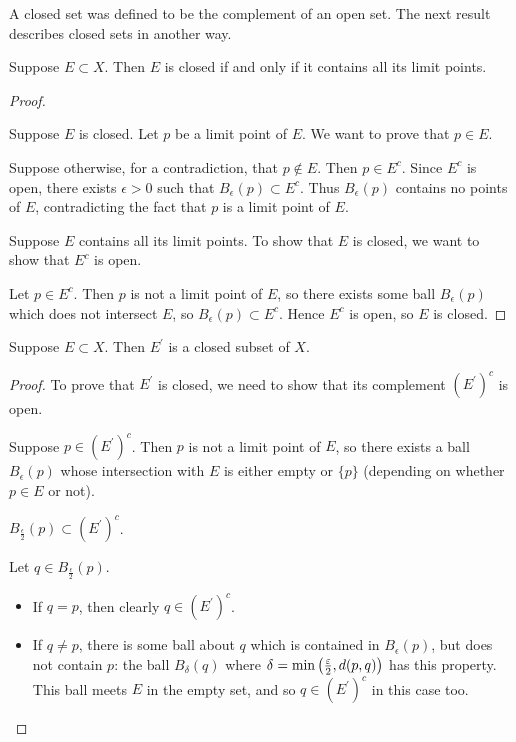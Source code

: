 A closed set was defined to be the complement of an open set. The next result describes closed sets in another way.

\begin{proposition}
Suppose $E\subset X$. Then $E$ is closed if and only if it contains all its limit points.
\end{proposition}

\begin{proof} \

\fbox{$\implies$} Suppose $E$ is closed. Let $p$ be a limit point of $E$. We want to prove that $p\in E$.

Suppose otherwise, for a contradiction, that $p\notin E$. Then $p\in E^c$. Since $E^c$ is open, there exists $\epsilon>0$ such that $B_\epsilon(p)\subset E^c$. Thus $B_\epsilon(p)$ contains no points of $E$, contradicting the fact that $p$ is a limit point of $E$.

\fbox{$\impliedby$} Suppose $E$ contains all its limit points. To show that $E$ is closed, we want to show that $E^c$ is open.

Let $p\in E^c$. Then $p$ is not a limit point of $E$, so there exists some ball $B_\epsilon(p)$ which does not intersect $E$, so $B_\epsilon(p)\subset E^c$. Hence $E^c$ is open, so $E$ is closed.
\end{proof}

\begin{proposition}
Suppose $E\subset X$. Then $E^\prime$ is a closed subset of $X$.
\end{proposition}

\begin{proof}
To prove that $E^\prime$ is closed, we need to show that its complement $(E^\prime)^c$ is open.

Suppose $p\in (E^\prime)^c$. Then $p$ is not a limit point of $E$, so there exists a ball $B_\epsilon(p)$ whose intersection with $E$ is either empty or $\{p\}$ (depending on whether $p\in E$ or not).
\begin{claim}
$B_\frac{\epsilon}{2}(p)\subset (E^\prime)^c$.
\end{claim}
Let $q\in B_\frac{\epsilon}{2}(p)$.
\begin{itemize}
\item If $q=p$, then clearly $q\in (E^\prime)^c$.
\item If $q\neq p$, there is some ball about $q$ which is contained in $B_\epsilon(p)$, but does not contain $p$: the ball $B_\delta(q)$ where $\delta=\min\left(\frac{\varepsilon}{2},d(p,q)\right)$ has this property. This ball meets $E$ in the empty set, and so $q\in (E^\prime)^c$ in this case too.
\end{itemize}
\end{proof}

